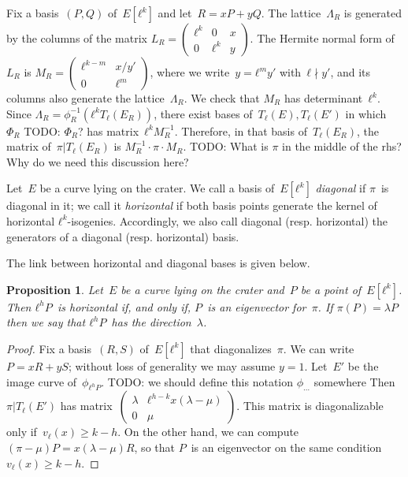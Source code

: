 \documentclass{lms}
\newcommand{\todo}[1]{{\color{red}TODO: #1}}
\newtheorem{prop}[thm]{Proposition}
\def\mat#1{\begin{pmatrix}#1\end{pmatrix}}
\def\smat#1{{\def\arraystretch{.7}\mat{#1}}}
\begin{document}
Fix a basis~$(P, Q)$ of~$E[ℓ^k]$ and let~$R = x P + y Q$.
The lattice~$Λ_R$ is generated by the columns of the matrix
$L_R = \left (\begin{smallmatrix}ℓ^k & 0 & x\\0 & ℓ^k & y\end{smallmatrix} \right )$.
The Hermite normal form of~$L_R$
is 
$M_R = \left (\begin{smallmatrix}ℓ^{k-m} & x/y' \\ 0 & ℓ^m\end{smallmatrix}\right )$,
where we write~$y = ℓ^m y'$ with~$ℓ ∤y'$,
and its columns also generate the lattice~$Λ_R$.
We check that $M_R$ has determinant~$ℓ^k$.
Since $Λ_R = ϕ_R^{-1} (ℓ^k T_{ℓ} (E_R))$,
there exist bases of~$T_ℓ(E), T_ℓ(E')$
in which $Φ_R$ \todo{$\Phi_R$?} has matrix~$ℓ^k M_R^{-1}$.
Therefore, in that basis of~$T_ℓ(E_R)$,
the matrix of~$π|T_ℓ(E_R)$ is $M_R^{-1} · π · M_R^{}$.
\todo{What is $\pi$ in the middle of the rhs? Why do we need this 
discussion here?}

\begin{defi}
  Let~$E$ be a curve lying on the crater. We call a
  basis of~$E[ℓ^k]$ \emph{diagonal} if $π$~is diagonal in it; we call
  it \emph{horizontal} if both basis points generate the kernel of
  horizontal $ℓ^k$-isogenies. Accordingly, we also call diagonal
  (resp. horizontal) the generators of a diagonal (resp. horizontal)
  basis.
\end{defi}

The link between horizontal and diagonal bases is given below.

\begin{prop} \label{prop:diagonal-horizontal}
Let~$E$ be a curve lying on the crater and~$P$ be a point of~$E[ℓ^k]$.
Then $ℓ^h P$~is horizontal if, and only if, $P$~is an eigenvector for~$π$.
If $π(P) = λ P$ then we say that $ℓ^h P$~has the direction~$λ$.
\end{prop}
\begin{proof}
Fix a basis~$(R, S)$ of~$E[ℓ^k]$ that diagonalizes~$π$.
We can write $P = x R + y S$;
without loss of generality we may assume $y=1$.
Let~$E'$ be the image curve of~$ϕ_{ℓ^h P}$. \todo{we should define
this notation $\phi_{\dots}$ somewhere}
Then $π|T_ℓ(E')$ has matrix~$\left ( \begin{smallmatrix}λ& ℓ^{h-k} x (λ-μ)\\ 0&μ
\end{smallmatrix}\right )$.
This matrix is diagonalizable only if~$v_{ℓ}(x) ≥ k - h$.
On the other hand, we can compute~$(π - μ) P = x (λ - μ) R$,
so that $P$~is an eigenvector on the same condition~$v_{ℓ}(x) ≥ k-h$.
\end{proof}
\end{document}
